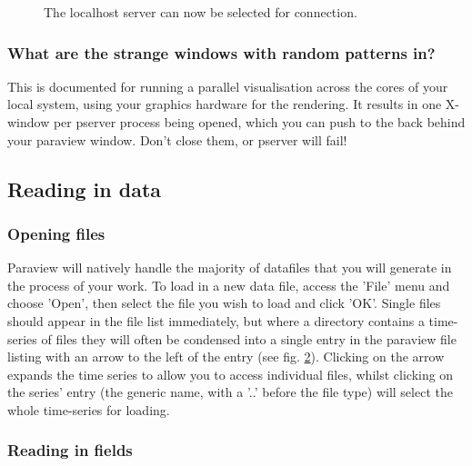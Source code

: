 \begin{figure}[h!]
\label{fig:paraview5}
  \centering
\caption{The localhost server can now be selected for connection.}
\end{figure}



\subsubsection{What are the strange windows with random patterns in?}

This is documented for running a parallel visualisation across the cores of your local system, using your graphics hardware for the rendering. It results in one X-window per pserver process being opened, which you can push to the back behind your paraview window. Don't close them, or pserver will fail!

\subsection{Reading in data}

\subsubsection{Opening files}

Paraview will natively handle the majority of datafiles that you will generate in the process of your work. To load in a new data file, access the 'File' menu and choose 'Open', then select the file you wish to load and click 'OK'. Single files should appear in the file list immediately, but where a directory contains a time-series of files they will often be condensed into a single entry in the paraview file listing with an arrow to the left of the entry (see fig. \ref{paraview6}). Clicking on the arrow expands the time series to allow you to access individual files, whilst clicking on the series' entry (the generic name, with a '..' before the file type) will select the whole time-series for loading.

\begin{figure}[h!]
\label{paraview6}
  \centering
\end{figure}

\subsubsection{Reading in fields}

